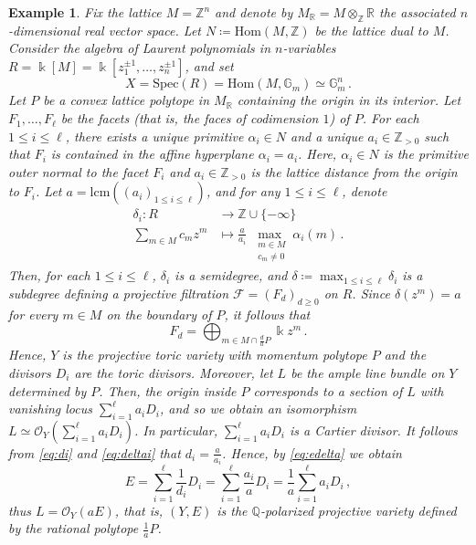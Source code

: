 \documentclass[12pt,letterpaper, reqno]{amsart}
\theoremstyle{defstyle} \newtheorem{definition}[theorem]{Definition}
\newtheorem{example}[theorem]{Example}
\theoremstyle{remark}
\numberwithin{equation}{section}
\numberwithin{figure}{section}
\newcommand{\cF} {\mathcal{F}}
\newcommand{\Spec} {\mathrm{Spec}}
\newcommand{\kk} {\Bbbk}
\newcommand{\Hom} {\mathrm{Hom}}
\newcommand{\QQ} {\mathbb{Q}}
\newcommand{\RR} {\mathbb{R}}
\newcommand{\ZZ} {\mathbb{Z}}
\begin{document}
\begin{example}
\label{Example:toric1}
Fix the lattice $M=\ZZ^n$ and denote by
$M_{\RR}=M\otimes_{\ZZ}\RR$ 
the associated $n$-dimensional real vector space. Let $N \coloneqq \Hom(M,\ZZ)$ be the lattice dual to $M$. Consider the algebra of Laurent polynomials in $n$-variables
$R = \kk[M] = \kk[z_1^{\pm 1}, \ldots ,z_n^{\pm 1}]$,
and set 
\[X = \Spec(R)=\Hom(M,\mathbb{G}_m) \simeq \mathbb{G}_m^n \,. \]
Let $P$ be a convex lattice polytope in $M_{\RR}$ containing the origin in its interior. Let $F_1,\ldots, F_{\ell}$ be the facets (that is, the faces of codimension $1$) of $P$. For each $1 \leq i \leq \ell $, there exists a unique primitive $\alpha_i \in N$ and a unique $a_i \in \ZZ_{> 0}$ such that $F_i$ is contained in the affine hyperplane $\alpha_i = a_i$. Here, $\alpha_i \in N$ is the primitive outer normal to the facet $F_i$ and $a_i \in \ZZ_{> 0}$ is the lattice distance from the origin to $F_i$. Let $a = \text{lcm}((a_i)_{1\leq i \leq \ell})$, and for any $1 \leq i \leq \ell$, denote
\begin{align}
\label{eq:deltai}
\delta_i \colon R & \longrightarrow \ZZ \cup \{ -\infty \} \\
\nonumber
\sum_{m \in M} c_m z^m & \longmapsto  \frac{a}{a_i} \max_{ \substack{ ~~m \in M\\~~c_m \neq 0}} \alpha_i(m) \,.
\end{align}
Then, for each $1 \leq i \leq \ell$, $\delta_i$ is a semidegree, and  $\delta \coloneqq \max_{1 \leq i \leq \ell } \delta_i$ is a subdegree defining a projective filtration $\cF= (F_d)_{d \geq 0}$ on $R$. Since $\delta(z^m) = a$ for every $m \in M$ on the boundary of $P$, it follows that 
\begin{equation} \label{Eq:Fd_toric}
F_d = \bigoplus_{m \in M \cap \frac{d}{a}P} \kk z^m\,.\end{equation} 
Hence, $Y$ is the projective toric variety with momentum polytope $P$ and the divisors $D_i$ are the toric divisors. Moreover, let $L$ be the ample line bundle on $Y$ determined by $P$. 
Then, the origin inside $P$ corresponds to a section of $L$ with vanishing locus $\sum_{i=1}^{\ell} a_i D_i$, and so we obtain an isomorphism $L \simeq \mathcal{O}_Y(\sum_{i=1}^{\ell} a_i D_i)$. 
In particular, $\sum_{i=1}^{\ell} a_i D_i$ is a Cartier divisor. 
It follows from \eqref{eq:di} and \eqref{eq:deltai} that $d_i = \frac{a}{a_i}$. Hence, by \eqref{eq:edelta} we obtain 
\[
E = \sum_{i=1}^{\ell} \frac{1}{d_i} D_i =  \sum_{i=1}^{\ell} \frac{a_i}{a} D_i= \frac{1}{a}  \sum_{i=1}^{\ell} a_i D_i\,, \]  
thus $L= \mathcal{O}_Y(aE)$, that is, $(Y, E)$ is the $\QQ$-polarized projective variety defined by the rational polytope 
$\frac{1}{a}P$.
\end{example}
\end{document}
